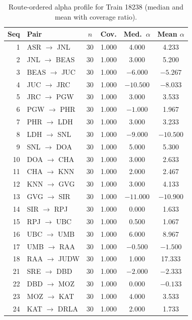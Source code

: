 \documentclass[a4paper,fleqn]{cas-dc}
\begin{document}
\begin{table}[width=\textwidth,pos=b]
\caption{Route-ordered alpha profile for Train 18238 (median and mean with
coverage ratio).}
\label{tab:route_alpha}
\setlength{\tabcolsep}{4pt}
\renewcommand{\arraystretch}{0.85}
\footnotesize
\begin{tabular*}{\tblwidth}{@{\extracolsep{\fill}}r l c c c c@{}}
\toprule
Seq & Pair & $n$ & Cov. & Med.\ $\alpha$ & Mean $\alpha$ \\
\midrule
1  & ASR $\to$ JNL  & 30 & 1.000 &   4.000 &   4.233 \\
2  & JNL $\to$ BEAS & 30 & 1.000 &   3.000 &   5.200 \\
3  & BEAS $\to$ JUC & 30 & 1.000 &  $-6.000$ &  $-5.267$ \\
4  & JUC $\to$ JRC  & 30 & 1.000 & $-10.500$ &  $-8.033$ \\
5  & JRC $\to$ PGW  & 30 & 1.000 &   3.000 &   3.533 \\
6  & PGW $\to$ PHR  & 30 & 1.000 &  $-1.000$ &   1.967 \\
7  & PHR $\to$ LDH  & 30 & 1.000 &   3.000 &   3.233 \\
8  & LDH $\to$ SNL  & 30 & 1.000 &  $-9.000$ & $-10.500$ \\
9  & SNL $\to$ DOA  & 30 & 1.000 &   5.000 &   5.300 \\
10 & DOA $\to$ CHA  & 30 & 1.000 &   3.000 &   2.633 \\
11 & CHA $\to$ KNN  & 30 & 1.000 &   2.000 &   2.467 \\
12 & KNN $\to$ GVG  & 30 & 1.000 &   3.000 &   4.133 \\
13 & GVG $\to$ SIR  & 30 & 1.000 & $-11.000$ & $-10.900$ \\
14 & SIR $\to$ RPJ  & 30 & 1.000 &   0.000 &   1.633 \\
15 & RPJ $\to$ UBC  & 30 & 1.000 &   0.500 &   1.067 \\
16 & UBC $\to$ UMB  & 30 & 1.000 &   6.000 &   8.967 \\
17 & UMB $\to$ RAA  & 30 & 1.000 &  $-0.500$ &  $-1.500$ \\
18 & RAA $\to$ JUDW & 30 & 1.000 &   1.000 &  17.333 \\
21 & SRE $\to$ DBD  & 30 & 1.000 &  $-2.000$ &  $-2.333$ \\
22 & DBD $\to$ MOZ  & 30 & 1.000 &   0.000 &  $-0.133$ \\
23 & MOZ $\to$ KAT  & 30 & 1.000 &   4.000 &   3.533 \\
24 & KAT $\to$ DRLA & 30 & 1.000 &   2.000 &   1.733 \\

\end{tabular*}
\end{table}
\end{document}
